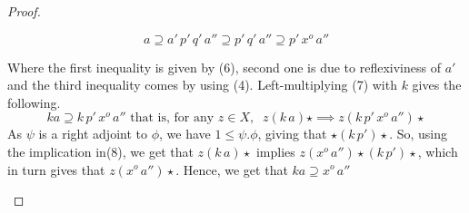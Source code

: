 \documentclass[18pt,a4paper]{article}
\theoremstyle{definition}
\begin{document}
\begin{proof}
\begin{enumerate}[label=(\roman*)]
					\begin{equation}
						a\supseteq a'\,p'\,q'\,a'' \supseteq p'\,q'\,a''
						\supseteq p' \,x^o \,a''
					\end{equation}

					Where the first inequality is given by (6), second one
					is due to reflexiviness	of $a'$ and the third inequality comes by using (4).
					Left-multiplying (7) with $k$ gives the following.
					\begin{equation}
						ka \supseteq k\,p'\,x^o\,a'' \text{ that is, for any } z\in X,
						\; \; z (k\, a) \star \implies z ( k\,p'\,x^o\,a'') \star
					\end{equation}
					As $\psi$ is a right adjoint to $\phi$, we have $1\leq \psi.\phi$, giving that
					$\star (k \, p' )\star $. So, using the implication in(8), we get that
					$z(k\, a) \star $ implies $z ( x^o\,a'') \star (k\,p') \star$, which in turn
					gives that $z(x^o \, a'')\star$. Hence, we get that $ka \supseteq x^o\, a''$
					\qedhere
			\end{enumerate}
		\end{proof}
		
\end{document}
